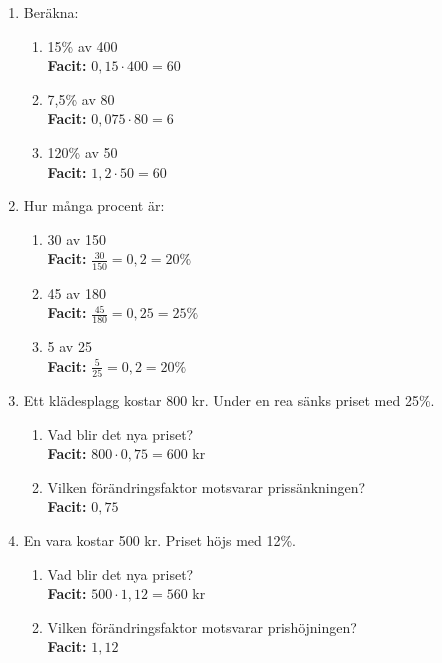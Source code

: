 \documentclass[a4paper,11pt]{article}
\begin{document}
\begin{enumerate}[label=\textbf{\arabic*.}]
    \item Beräkna:
    \begin{enumerate}[label=\alph*)]
        \item 15\% av 400
        \\ \textbf{Facit:} $0,15 \cdot 400 = 60$
        \item 7,5\% av 80
        \\ \textbf{Facit:} $0,075 \cdot 80 = 6$
        \item 120\% av 50
        \\ \textbf{Facit:} $1,2 \cdot 50 = 60$
    \end{enumerate}
    
    \item Hur många procent är:
    \begin{enumerate}[label=\alph*)]
        \item 30 av 150
        \\ \textbf{Facit:} $\frac{30}{150} = 0,2 = 20\%$
        \item 45 av 180
        \\ \textbf{Facit:} $\frac{45}{180} = 0,25 = 25\%$
        \item 5 av 25
        \\ \textbf{Facit:} $\frac{5}{25} = 0,2 = 20\%$
    \end{enumerate}
    
    \item Ett klädesplagg kostar 800 kr. Under en rea sänks priset med 25\%.
    \begin{enumerate}[label=\alph*)]
        \item Vad blir det nya priset?
        \\ \textbf{Facit:} $800 \cdot 0,75 = 600$ kr
        \item Vilken förändringsfaktor motsvarar prissänkningen?
        \\ \textbf{Facit:} $0,75$
    \end{enumerate}
    
    \item En vara kostar 500 kr. Priset höjs med 12\%.
    \begin{enumerate}[label=\alph*)]
        \item Vad blir det nya priset?
        \\ \textbf{Facit:} $500 \cdot 1,12 = 560$ kr
        \item Vilken förändringsfaktor motsvarar prishöjningen?
        \\ \textbf{Facit:} $1,12$
    \end{enumerate}
    

\end{enumerate}
\end{document}
